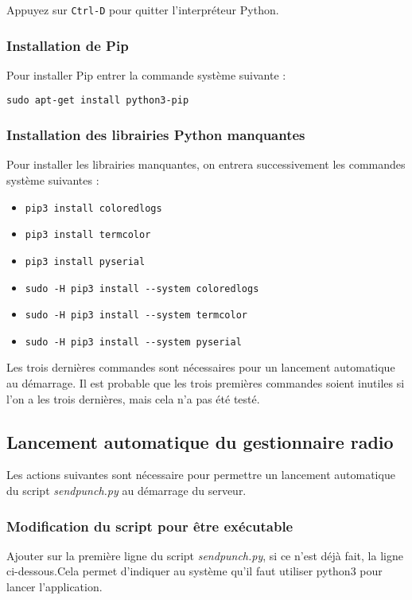\documentclass[a4paper]{ffco-rapport}
\begin{document}
		Appuyez sur \verb|Ctrl-D| pour quitter l'interpréteur Python.
		
		\subsubsection{Installation de Pip}
			Pour installer Pip entrer la commande système suivante :
			
			\verb|sudo apt-get install python3-pip|
			
		\subsubsection{Installation des librairies Python manquantes}
			Pour installer les librairies manquantes, on entrera successivement les commandes système suivantes :
			
			\begin{itemize}
				\item \verb|pip3 install coloredlogs|
				\item \verb|pip3 install termcolor|
				\item \verb|pip3 install pyserial|
				\item \verb|sudo -H pip3 install --system coloredlogs|
				\item \verb|sudo -H pip3 install --system termcolor|
				\item \verb|sudo -H pip3 install --system pyserial|
			\end{itemize}

			Les trois dernières commandes sont nécessaires pour un lancement automatique au démarrage. Il est probable que les trois premières commandes soient inutiles si l'on a les trois dernières, mais cela n'a pas été testé.

	\subsection{Lancement automatique du gestionnaire radio}
		Les actions suivantes sont nécessaire pour permettre un lancement automatique du script \emph{sendpunch.py} au démarrage du serveur.
		
		\subsubsection{Modification du script pour être exécutable}
			Ajouter sur la première ligne du script \emph{sendpunch.py}, si ce n'est déjà fait, la ligne ci-dessous.Cela permet d'indiquer au système qu'il faut utiliser python3 pour lancer l'application.
			
\end{document}
